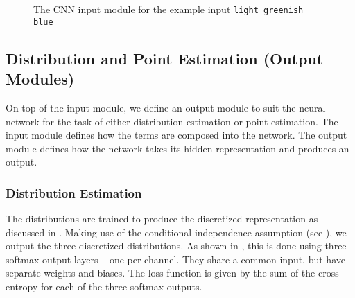 \documentclass[]{book}
\newcommand{\natlang}[1]{\texttt{#1}}
\begin{document}
\begin{figure}
	
	\caption{The CNN input module for the example input \natlang{light greenish blue}}
	\label{fig:cnnmod}
\end{figure}





\subsection{Distribution and Point Estimation (Output Modules)}\label{sec:outputmod}
On top of the input module, we define an output module to suit the neural network for the task of either distribution estimation or point estimation.
The input module defines how the terms are composed into the network.
The output module defines how the network takes its hidden representation and produces an output.


\subsubsection{Distribution Estimation}\label{sec:distmod}
The distributions are trained to produce the discretized representation as discussed in .
Making use of the conditional independence assumption (see ), we output the three discretized distributions.
As shown in , this is done using three softmax output layers -- one per channel.
They share a common input, but have separate weights and biases.
The loss function is given by the sum of the cross-entropy for each of the three softmax outputs.
\end{document}
